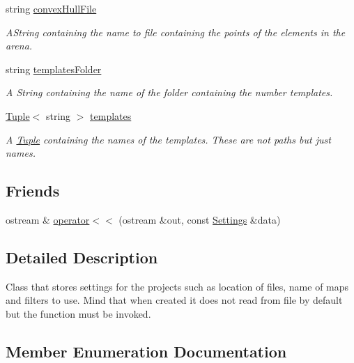 \begin{DoxyCompactItemize}
string \mbox{\hyperlink{class_settings_aae9ea78e634fee8a76c2eb2b6fd09eeb}{convex\+Hull\+File}}
\begin{DoxyCompactList}\small\item\em A\+String containing the name to file containing the points of the elements in the arena. \end{DoxyCompactList}\item 
string \mbox{\hyperlink{class_settings_a3c272482637bc9c3a534e08e75157830}{templates\+Folder}}
\begin{DoxyCompactList}\small\item\em A String containing the name of the folder containing the number templates. \end{DoxyCompactList}\item 
\mbox{\hyperlink{class_tuple}{Tuple}}$<$ string $>$ \mbox{\hyperlink{class_settings_add9f0e9a114013a3295ba056e19d991f}{templates}}
\begin{DoxyCompactList}\small\item\em A \mbox{\hyperlink{class_tuple}{Tuple}} containing the names of the templates. These are not paths but just names. \end{DoxyCompactList}\end{DoxyCompactItemize}
\subsection*{Friends}
\begin{DoxyCompactItemize}
\item 
ostream \& \mbox{\hyperlink{class_settings_ae9bfb3fa2d38f0ebe2e74b782790da98}{operator$<$$<$}} (ostream \&out, const \mbox{\hyperlink{class_settings}{Settings}} \&data)
\end{DoxyCompactItemize}


\subsection{Detailed Description}
Class that stores settings for the projects such as location of files, name of maps and filters to use. Mind that when created it does not read from file by default but the function must be invoked. 

\subsection{Member Enumeration Documentation}
\mbox{\label{class_settings_a30d85f2e06a54ae9bc8da2d01037658f}} 
